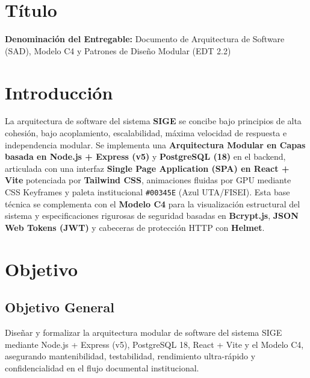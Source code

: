 \documentclass[11pt,a4paper]{article}
\begin{document}

\vspace{0.25cm}
\section{Título}
\textbf{Denominación del Entregable:} Documento de Arquitectura de Software (SAD), Modelo C4 y Patrones de Diseño Modular (EDT 2.2)



\section{Introducción}
La arquitectura de software del sistema \textbf{SIGE} se concibe bajo principios de alta cohesión, bajo acoplamiento, escalabilidad, máxima velocidad de respuesta e independencia modular. Se implementa una \textbf{Arquitectura Modular en Capas basada en Node.js + Express (v5)} y \textbf{PostgreSQL (18)} en el backend, articulada con una interfaz \textbf{Single Page Application (SPA) en React + Vite} potenciada por \textbf{Tailwind CSS}, animaciones fluidas por GPU mediante CSS Keyframes y paleta institucional \texttt{\#00345E} (Azul UTA/FISEI). Esta base técnica se complementa con el \textbf{Modelo C4} para la visualización estructural del sistema y especificaciones rigurosas de seguridad basadas en \textbf{Bcrypt.js}, \textbf{JSON Web Tokens (JWT)} y cabeceras de protección HTTP con \textbf{Helmet}.

\section{Objetivo}

\subsection{Objetivo General}
Diseñar y formalizar la arquitectura modular de software del sistema SIGE mediante Node.js + Express (v5), PostgreSQL 18, React + Vite y el Modelo C4, asegurando mantenibilidad, testabilidad, rendimiento ultra-rápido y confidencialidad en el flujo documental institucional.
\end{document}
